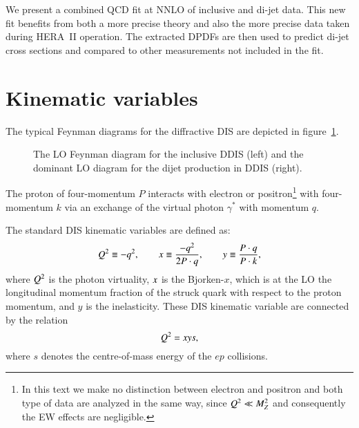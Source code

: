 \documentclass[12pt]{article}
\newcommand{\includegraphicss}[2][]{\fbox{\texttt{[image: \#2]}}}
\begin{document}
We present a combined QCD fit at NNLO of inclusive and di-jet data.
This new fit benefits from both a more precise theory and also the more precise  data taken during HERA~II operation.
The extracted DPDFs are then used to predict di-jet cross sections and compared to other measurements not included in the fit. 

\section{Kinematic variables}
The typical Feynman diagrams for the diffractive DIS are depicted in figure~\ref{figDDISdiagram}.
%
\begin{figure}[tbhp]
\centering
\begin{minipage}[t]{0.47\textwidth}
\includegraphicss[trim={0cm 0.0cm 0 0.0cm},clip,width=.9\textwidth]{{{plots/diagrams/inclusive}}}
\end{minipage}
\begin{minipage}[t]{0.47\textwidth}
\includegraphicss[trim={0cm 1.2cm 0 1.1cm},clip,width=.9\textwidth]{{{plots/diagrams/dijet}}}
\end{minipage}
\caption{The LO Feynman diagram for the inclusive DDIS (left) and the dominant LO diagram for the dijet production in DDIS (right).}
\label{figDDISdiagram}
\end{figure}
%
The proton of four-momentum $P$ interacts with electron or positron\footnote{In this text we make no distinction between electron and positron and both type of data are analyzed in the same way, since $Q^2 \ll M_Z^2$ and consequently the EW effects are negligible.} with four-momentum $k$ via an exchange of the virtual photon $\gamma^{*}$ with momentum $q$.

The standard DIS kinematic variables are defined as:
\begin{equation}
Q^2 \equiv -q^2, \qquad x \equiv \frac{-q^2}{2P\cdot q},\qquad y \equiv \frac{P\cdot q}{P\cdot k},
\end{equation}
where $Q^2$ is the photon virtuality, $x$ is the Bjorken-$x$, which is at the LO the longitudinal momentum fraction of the struck quark with respect to the proton momentum, and $y$ is the inelasticity.
These DIS kinematic variable are connected by the relation
\begin{equation}
Q^2 = x y s,
\end{equation}
where $s$ denotes the centre-of-mass energy of the $ep$ collisions.
\end{document}
